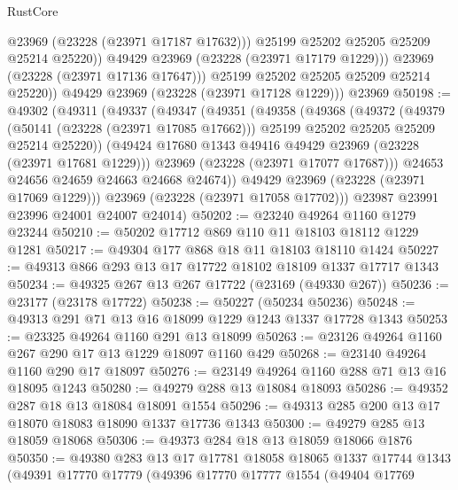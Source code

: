 \begin{lexlean}{RustCore}
\begin{coremodule}
                    @23969
                    (@23228 (@23971 @17187 @17632)))
                  @25199
                  @25202
                  @25205
                  @25209
                  @25214
                  @25220))
              @49429
              @23969
              (@23228 (@23971 @17179 @1229)))
            @23969
            (@23228 (@23971 @17136 @17647)))
          @25199
          @25202
          @25205
          @25209
          @25214
          @25220))
      @49429
      @23969
      (@23228 (@23971 @17128 @1229)))
    @23969
@50198 := @49302
    (@49311
      (@49337
        (@49347
          (@49351
            (@49358
              (@49368
                (@49372
                  (@49379
                    (@50141 (@23228 (@23971 @17085 @17662)))
                    @25199
                    @25202
                    @25205
                    @25209
                    @25214
                    @25220))
                (@49424 @17680 @1343 @49416 @49429 @23969 (@23228 (@23971 @17681 @1229)))
                @23969
                (@23228 (@23971 @17077 @17687)))
              @24653
              @24656
              @24659
              @24663
              @24668
              @24674))
          @49429
          @23969
          (@23228 (@23971 @17069 @1229)))
        @23969
        (@23228 (@23971 @17058 @17702)))
      @23987
      @23991
      @23996
      @24001
      @24007
      @24014)
@50202 := @23240 @49264 @1160 @1279 @23244
@50210 := @50202 @17712 @869 @110 @11 @18103 @18112 @1229 @1281
@50217 := @49304 @177 @868 @18 @11 @18103 @18110 @1424
@50227 := @49313 @866 @293 @13 @17 @17722 @18102 @18109 @1337 @17717 @1343
@50234 := @49325 @267 @13 @267 @17722 (@23169 (@49330 @267))
@50236 := @23177 (@23178 @17722)
@50238 := @50227 (@50234 @50236)
@50248 := @49313 @291 @71 @13 @16 @18099 @1229 @1243 @1337 @17728 @1343
@50253 := @23325 @49264 @1160 @291 @13 @18099
@50263 := @23126 @49264 @1160 @267 @290 @17 @13 @1229 @18097 @1160 @429
@50268 := @23140 @49264 @1160 @290 @17 @18097
@50276 := @23149 @49264 @1160 @288 @71 @13 @16 @18095 @1243
@50280 := @49279 @288 @13 @18084 @18093
@50286 := @49352 @287 @18 @13 @18084 @18091 @1554
@50296 := @49313 @285 @200 @13 @17 @18070 @18083 @18090 @1337 @17736 @1343
@50300 := @49279 @285 @13 @18059 @18068
@50306 := @49373 @284 @18 @13 @18059 @18066 @1876
@50350 := @49380
    @283
    @13
    @17
    @17781
    @18058
    @18065
    @1337
    @17744
    @1343
    (@49391
      @17770
      @17779
      (@49396
        @17770
        @17777
        @1554
        (@49404
          @17769

\end{coremodule}
\end{lexlean}
